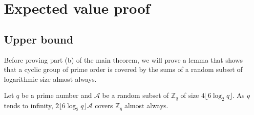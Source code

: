 \chapter{Expected value proof}\label{chap:expected_value_proof}


\section{Upper bound}\label{sec:results:upperbound}
Before proving part (b) of the main theorem, we will prove a lemma that shows that a cyclic group of prime order is covered by the sums of a random subset of logarithmic size almost always.
\begin{lemma}\label{lem:sumset}
    Let $q$ be a prime number and $\mathcal{A}$ be a random subset of $\mathbb{Z}_q$ of size $4\lfloor6\log_2 q\rfloor$. As $q$ tends to infinity, $2\lfloor6\log_2 q\rfloor \mathcal{A}$ covers $\mathbb{Z}_q$ almost always. 
\end{lemma}

